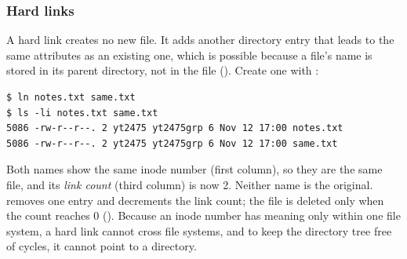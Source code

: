 \subsubsection{Hard links}
A hard link creates no new file. It adds another directory entry that leads to the same attributes as an existing one, which is possible because a file's name is stored in its parent directory, not in the file (). Create one with :
\begin{lstlisting}[style=sh]
$ ln notes.txt same.txt
$ ls -li notes.txt same.txt
5086 -rw-r--r--. 2 yt2475 yt2475grp 6 Nov 12 17:00 notes.txt
5086 -rw-r--r--. 2 yt2475 yt2475grp 6 Nov 12 17:00 same.txt
\end{lstlisting}
Both names show the same inode number (first column), so they are the same file, and its \emph{link count} (third column) is now 2. Neither name is the original.  removes one entry and decrements the link count; the file is deleted only when the count reaches 0 (). Because an inode number has meaning only within one file system, a hard link cannot cross file systems, and to keep the directory tree free of cycles, it cannot point to a directory.

